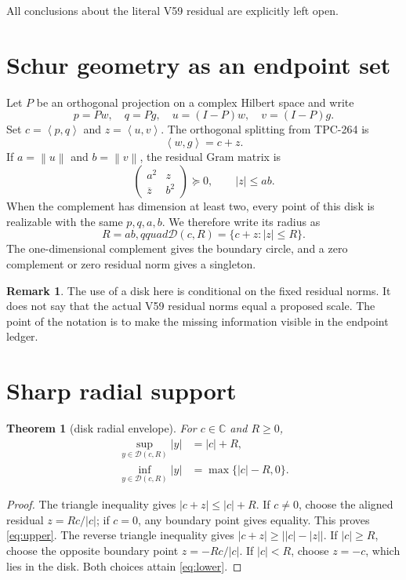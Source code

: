 \documentclass[11pt]{article}
\newtheorem{theorem}{Theorem}
\theoremstyle{definition}
\newtheorem{remark}{Remark}
\newcommand{\ip}[2]{\left\langle #1,#2\right\rangle}
\newcommand{\norm}[1]{\left\lVert #1\right\rVert}
\newcommand{\C}{\mathbb C}
\begin{document}
All conclusions about the literal V59 residual are explicitly left open.

\section{Schur geometry as an endpoint set}

Let $P$ be an orthogonal projection on a complex Hilbert space and write
\[
 p=Pw,\quad q=Pg,\quad u=(I-P)w,\quad v=(I-P)g.
\]
Set $c=\ip{p}{q}$ and $z=\ip{u}{v}$.  The orthogonal splitting from TPC-264
is
\begin{equation}
 \ip{w}{g}=c+z.
 \label{eq:split}
\end{equation}
If $a=\norm{u}$ and $b=\norm{v}$, the residual Gram matrix is
\[
 \begin{pmatrix}a^2&z\\ \overline z&b^2\end{pmatrix}\succeq0,
 \qquad |z|\leq ab.
\]
When the complement has dimension at least two, every point of this disk is
realizable with the same $p,q,a,b$.  We therefore write its radius as
\[
 R=ab,qquad \mathcal D(c,R)=\{c+z:|z|\leq R\}.
\]
The one-dimensional complement gives the boundary circle, and a zero
complement or zero residual norm gives a singleton.

\begin{remark}
The use of a disk here is conditional on the fixed residual norms.  It does
not say that the actual V59 residual norms equal a proposed scale.  The point
of the notation is to make the missing information visible in the endpoint
ledger.
\end{remark}

\section{Sharp radial support}

\begin{theorem}[disk radial envelope]
For $c\in\C$ and $R\geq0$,
\begin{align}
 \sup_{y\in\mathcal D(c,R)}|y|&=|c|+R, \label{eq:upper}\\
 \inf_{y\in\mathcal D(c,R)}|y|&=\max\{|c|-R,0\}. \label{eq:lower}
\end{align}
\end{theorem}

\begin{proof}
The triangle inequality gives $|c+z|\leq|c|+R$.  If $c\neq0$, choose
the aligned residual $z=Rc/|c|$; if $c=0$, any boundary point gives equality.
This proves \eqref{eq:upper}.  The reverse triangle inequality gives
$|c+z|\geq\bigl||c|-|z|\bigr|$.  If $|c|\geq R$, choose the opposite
boundary point $z=-Rc/|c|$.  If $|c|<R$, choose $z=-c$, which lies in the
disk.  Both choices attain \eqref{eq:lower}.
\end{proof}
\end{document}
